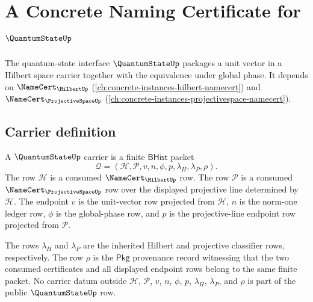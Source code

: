 \chapter{A Concrete Naming Certificate for $\QuantumStateUp$}
\label{ch:concrete-instances-quantumstate-namecert}

The quantum-state interface $\QuantumStateUp$ packages a unit vector in a Hilbert space carrier together with the equivalence under global phase. It depends on $\NameCert_{\HilbertUp}$ (\autoref{ch:concrete-instances-hilbert-namecert}) and $\NameCert_{\ProjectiveSpaceUp}$ (\autoref{ch:concrete-instances-projectivespace-namecert}).

\section{Carrier definition}
\label{sec:quantumstate-carrier}

\begin{definition}
\label{def:quantumstate-bhist-carrier}
A $\QuantumStateUp$ carrier is a finite $\mathsf{BHist}$ packet
$$
\mathcal{Q}=(\mathcal{H},\mathcal{P},v,n,\phi,p,\lambda_H,\lambda_P,\rho).
$$
The row $\mathcal{H}$ is a consumed $\NameCert_{\HilbertUp}$ row. The row
$\mathcal{P}$ is a consumed $\NameCert_{\ProjectiveSpaceUp}$ row over the
displayed projective line determined by $\mathcal{H}$. The endpoint $v$ is the
unit-vector row projected from $\mathcal{H}$, $n$ is the norm-one ledger row,
$\phi$ is the global-phase row, and $p$ is the projective-line endpoint row
projected from $\mathcal{P}$.

The rows $\lambda_H$ and $\lambda_P$ are the inherited Hilbert and projective
classifier rows, respectively. The row $\rho$ is the $\mathsf{Pkg}$ provenance
record witnessing that the two consumed certificates and all displayed endpoint
rows belong to the same finite packet. No carrier datum outside
$\mathcal{H}$, $\mathcal{P}$, $v$, $n$, $\phi$, $p$, $\lambda_H$, $\lambda_P$,
and $\rho$ is part of the public $\QuantumStateUp$ row.
\end{definition}
